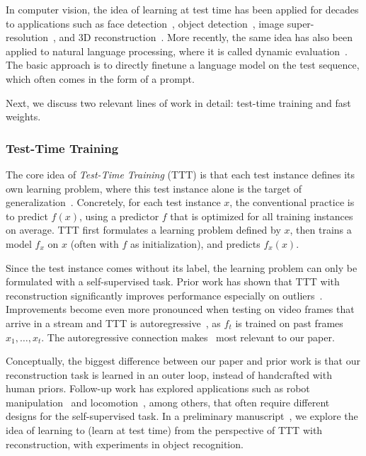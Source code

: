 \documentclass{article}
\begin{document}
In computer vision, the idea of learning at test time has been applied for decades to applications such as face detection~\cite{jain2011online}, object detection~\cite{mullapudi2018online}, image super-resolution~\cite{shocher2018zero}, and 3D reconstruction~\cite{luo2020consistent}.
More recently, the same idea has also been applied to natural language processing, where it is called dynamic evaluation~\cite{krause2018dynamic, krause2019dynamic}.
The basic approach is to directly finetune a language model on the test sequence, which often comes in the form of a prompt.

Next, we discuss two relevant lines of work in detail: test-time training and fast weights.

\subsubsection{Test-Time Training}

The core idea of \emph{Test-Time Training} (TTT) is that each test instance defines its own learning problem, where this test instance alone is the target of generalization~\cite{sun2020test}.
Concretely, for each test instance $x$, the conventional practice is to predict $f(x)$, using a predictor $f$ that is optimized for all training instances on average.
TTT first formulates a learning problem defined by $x$, then trains a model $f_x$ on $x$ (often with $f$ as initialization), and predicts $f_x(x)$.

Since the test instance comes without its label, the learning problem can only be formulated with a self-supervised task. Prior work has shown that TTT with reconstruction significantly improves performance especially on outliers~\cite{ttt-mae}. 
Improvements become even more pronounced when testing on video frames that arrive in a stream and TTT is autoregressive~\cite{wang2023test}, as $f_t$ is trained on past frames $x_1, \dots, x_t$.
The autoregressive connection makes~\cite{wang2023test} most relevant to our paper.

Conceptually, the biggest difference between our paper and prior work is that our reconstruction task is learned in an outer loop, instead of handcrafted with human priors.
Follow-up work has explored applications such as 
robot manipulation~\cite{hansen2020self} and locomotion~\cite{sun2021online},
among others, that often require different designs for the self-supervised task.
In a preliminary manuscript~\cite{sun2023learning}, we explore the idea of learning to (learn at test time) from the perspective of TTT with reconstruction, with experiments in object recognition.
\end{document}
